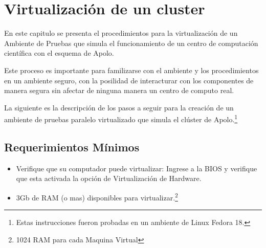 \section{Virtualización de un cluster}


En este capitulo se presenta el procedimientos para la virtualización de un Ambiente de Pruebas que simula el funcionamiento de un centro de computación científica con el esquema de Apolo. 

Este proceso es importante para familizarse con el ambiente y los procedimientos en un ambiente seguro, con la posilidad de interacturar con los componentes de manera segura sin afectar de ninguna manera un centro de computo real. 

La siguiente es la descripción de los pasos a seguir para la creación de un ambiente de pruebas paralelo virtualizado que simula el clúster de Apolo.\footnote{Estas instrucciones fueron probadas en un ambiente de Linux Fedora 18.}

\subsection{Requerimientos Mínimos}

\begin{itemize}
	\item Verifique que su computador puede virtualizar: Ingrese a la BIOS y verifique que esta activada la opción de Virtualización de Hardware. 

	\item 3Gb de RAM (o mas)  disponibles para virtualizar.\footnote{1024 RAM para cada Maquina Virtual}
\end{itemize}

